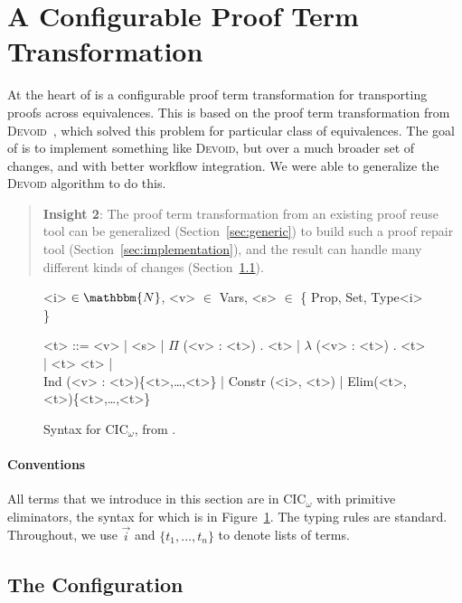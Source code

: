 \section{A Configurable Proof Term Transformation}
\label{sec:key2}

At the heart of \toolname is a configurable proof term transformation for transporting
proofs across equivalences. This is based on the proof term transformation from 
\textsc{Devoid}~\cite{Ringer2019}, which solved this problem for particular class of equivalences.
The goal of \toolname is to implement something like \textsc{Devoid}, but over
a much broader set of changes, and with better workflow integration.
We were able to generalize the \textsc{Devoid} algorithm to do this.

\begin{quote}
\textbf{Insight 2}:
The proof term transformation from an existing proof reuse tool can be generalized (Section~\ref{sec:generic})
to build such a proof repair tool (Section~\ref{sec:implementation}), and the result can handle 
many different kinds of changes (Section~\ref{sec:configurable}).
\end{quote}

\begin{figure}
\small
\begin{grammar}
<i> $\in \mathbbm{N}$, <v> $\in$ Vars, <s> $\in$ \{ Prop, Set, Type<i> \}

<t> ::= <v> | <s> | $\Pi$ (<v> : <t>) . <t> | $\lambda$ (<v> : <t>) . <t> | <t> <t> | \\ 
Ind (<v> : <t>)\{<t>,\ldots,<t>\} | Constr (<i>, <t>) | Elim(<t>, <t>)\{<t>,\ldots,<t>\}
\end{grammar}
\caption{Syntax for CIC$_\omega$, from \citet{Timany2015FirstST}.}
\label{fig:syntax}
\end{figure}

\paragraph{Conventions}
All terms that we introduce in this section are in CIC$_{\omega}$ with primitive eliminators,
the syntax for which is in Figure~\ref{fig:syntax}.
The typing rules are standard.
Throughout, we use $\vec{i}$ and $\{t_1, \ldots, t_n\}$ to denote lists of terms.

\subsection{The Configuration}
\label{sec:configurable}

